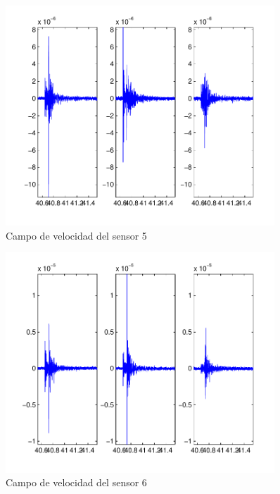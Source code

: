 \begin{figure}[H]
\includegraphics[width=0.9\textwidth,height=0.4\textheight]{linea_timerev/figuras/plotSensor(Ev(1),5).pdf}
\caption{Campo de velocidad del sensor 5}
\end{figure}
\begin{figure}[H]
\includegraphics[width=0.9\textwidth,height=0.4\textheight]{linea_timerev/figuras/plotSensor(Ev(1),6).pdf}
\caption{Campo de velocidad del sensor 6}
\end{figure}
